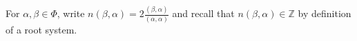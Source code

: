 For $\alpha, \beta \in \Phi$, write $n(\beta, \alpha) = 2\frac{(\beta, \alpha)}{(\alpha, \alpha)}$ and
recall that $n(\beta, \alpha) \in \mathbb{Z}$ by definition of a root system.
